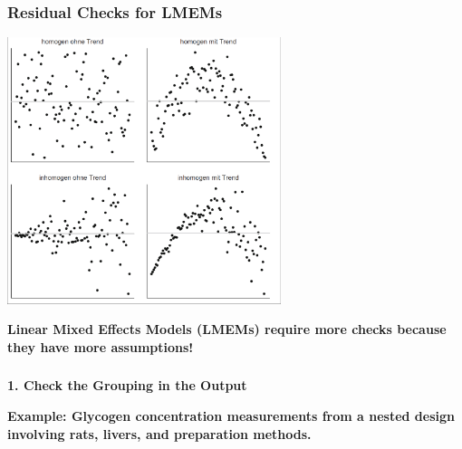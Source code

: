\documentclass{beamer}
\begin{document}
\begin{frame}
    \frametitle{Residual Checks for LMEMs}
    \begin{center}
    \includegraphics[width=0.6\textwidth]{lectures/day_7_diagnostics_of_mems/figures/residuals.png}    
    \end{center}
    \textbf{Linear Mixed Effects Models (LMEMs) require more checks because they have more assumptions!}
\end{frame}

\begin{frame}
    \frametitle{}
    \huge\color{purple}\textbf{1. Check the Grouping in the Output}
    \vspace{0.5cm}
    
    \normalsize\color{black}\textbf{Example: Glycogen concentration measurements from a nested design involving rats, livers, and preparation methods.}
\end{frame}
\end{document}
